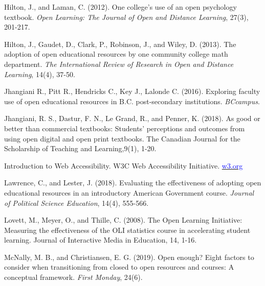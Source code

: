 \documentclass[11pt]{article}
\newcommand{\alink}[2]{\href{#1}{\textcolor{blue}{#2}}}
\begin{document}
\begin{thebibliography}{99}
   Hilton, J., and Laman, C. (2012). One college’s use of an open psychology textbook. {\em Open Learning: The Journal of Open and Distance Learning}, 27(3), 201-217.

   Hilton, J., Gaudet, D., Clark, P., Robinson, J., and Wiley, D. (2013). The adoption of open educational resources by one community college math department. {\em The International Review of Research in Open and Distance Learning}, 14(4), 37-50.

   Jhangiani R., Pitt R., Hendricks C., Key J., Lalonde C. (2016). Exploring faculty use of open educational resources in B.C. post-secondary institutions. {\em BCcampus}. %

   Jhangiani, R. S., Dastur, F. N., Le Grand, R., and Penner, K. (2018). As good or better than commercial textbooks: Students' perceptions and outcomes from using open digital and open print textbooks. The Canadian Journal for the Scholarship of Teaching and Learning,9(1), 1-20.

   Introduction to Web Accessibility.  W3C Web Accessibility Initiative. \alink{w3.org}{w3.org}%

   Lawrence, C., and Lester, J. (2018). Evaluating the effectiveness of adopting open educational resources in an introductory American Government course. {\em Journal of Political Science Education}, 14(4), 555-566.

   Lovett, M., Meyer, O., and Thille, C. (2008). The Open Learning Initiative: Measuring the effectiveness of the OLI statistics course in accelerating student learning. Journal of Interactive Media in Education, 14, 1-16.

   McNally, M. B., and Christiansen, E. G. (2019). Open enough? Eight factors to consider when transitioning from closed to open resources and courses: A conceptual framework. {\em First Monday}, 24(6).%


\end{thebibliography}
\end{document}
